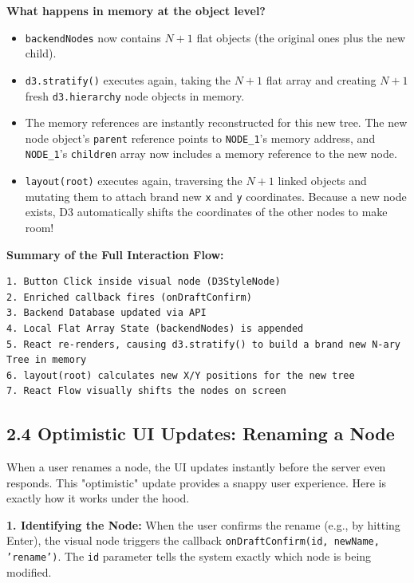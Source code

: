 \documentclass[12pt, a4paper]{article}
\begin{document}
\textbf{What happens in memory at the object level?}
\begin{itemize}
    \item \texttt{backendNodes} now contains $N+1$ flat objects (the original ones plus the new child).
    \item \texttt{d3.stratify()} executes again, taking the $N+1$ flat array and creating $N+1$ fresh \texttt{d3.hierarchy} node objects in memory.
    \item The memory references are instantly reconstructed for this new tree. The new node object's \texttt{parent} reference points to \texttt{NODE\_1}'s memory address, and \texttt{NODE\_1}'s \texttt{children} array now includes a memory reference to the new node.
    \item \texttt{layout(root)} executes again, traversing the $N+1$ linked objects and mutating them to attach brand new \texttt{x} and \texttt{y} coordinates. Because a new node exists, D3 automatically shifts the coordinates of the other nodes to make room!
\end{itemize}

\textbf{Summary of the Full Interaction Flow:}
\begin{codebox}
\begin{verbatim}
1. Button Click inside visual node (D3StyleNode)
2. Enriched callback fires (onDraftConfirm)
3. Backend Database updated via API
4. Local Flat Array State (backendNodes) is appended
5. React re-renders, causing d3.stratify() to build a brand new N-ary Tree in memory
6. layout(root) calculates new X/Y positions for the new tree
7. React Flow visually shifts the nodes on screen
\end{verbatim}
\end{codebox}

\subsection{2.4 Optimistic UI Updates: Renaming a Node}
When a user renames a node, the UI updates instantly before the server even responds. This "optimistic" update provides a snappy user experience. Here is exactly how it works under the hood.

\textbf{1. Identifying the Node:}
When the user confirms the rename (e.g., by hitting Enter), the visual node triggers the callback \texttt{onDraftConfirm(id, newName, 'rename')}. The \texttt{id} parameter tells the system exactly which node is being modified.
\end{document}
